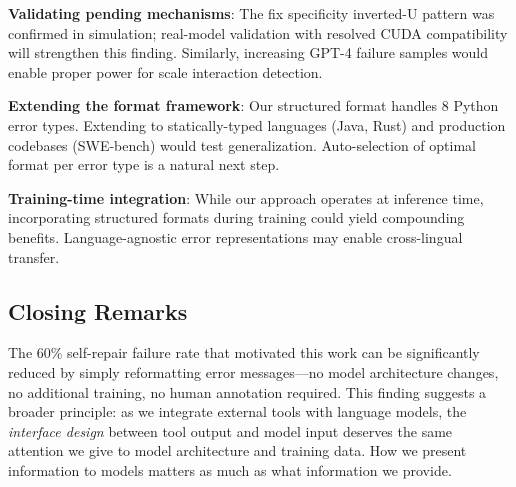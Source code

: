 \textbf{Validating pending mechanisms}: The fix specificity inverted-U pattern was confirmed in simulation; real-model validation with resolved CUDA compatibility will strengthen this finding. Similarly, increasing GPT-4 failure samples would enable proper power for scale interaction detection.

\textbf{Extending the format framework}: Our structured format handles 8 Python error types. Extending to statically-typed languages (Java, Rust) and production codebases (SWE-bench) would test generalization. Auto-selection of optimal format per error type is a natural next step.

\textbf{Training-time integration}: While our approach operates at inference time, incorporating structured formats during training could yield compounding benefits. Language-agnostic error representations may enable cross-lingual transfer.

\subsection{Closing Remarks}

The 60\% self-repair failure rate that motivated this work can be significantly reduced by simply reformatting error messages---no model architecture changes, no additional training, no human annotation required. This finding suggests a broader principle: as we integrate external tools with language models, the \emph{interface design} between tool output and model input deserves the same attention we give to model architecture and training data. How we present information to models matters as much as what information we provide.
